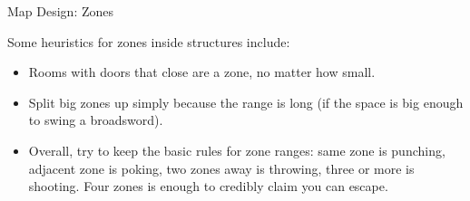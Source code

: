 \begin{sidebox}{Map Design: Zones}

Some heuristics for zones inside structures include:

\begin{itemize}
\item Rooms with doors that close are a zone, no matter how small.
\item Split big zones up simply because the range is long (if the space is big enough to swing a broadsword).
\item Overall, try to keep the basic rules for zone ranges: same zone is punching, adjacent zone is poking, two zones away is throwing, three or more is shooting. Four zones is enough to credibly claim you can escape.
\end{itemize}

\end{sidebox}
